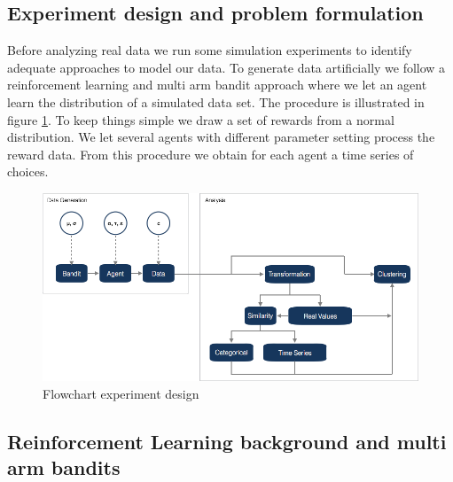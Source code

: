 \documentclass[12pt,a4paper,bibliography=totocnumbered,listof=totocnumbered]{scrartcl}
\begin{document}
\subsection{Experiment design and problem formulation}

Before analyzing real data we run some simulation experiments to identify adequate approaches to model our data. To generate data artificially we follow a reinforcement learning and multi arm bandit approach where we let an agent learn the distribution of a simulated data set. The procedure is illustrated in figure \ref{fig:flow}. To keep things simple we draw a set of rewards from a normal distribution. We let several agents with different parameter setting process the reward data. From this procedure we obtain for each agent a time series of choices. 

 \begin{figure}[!htb]
	\includegraphics[width=\textwidth]{Pictures/flow01.png}
	\caption{Flowchart experiment design}
	\label{fig:flow}
\end{figure}

\subsection{Reinforcement Learning background and multi arm bandits}
\end{document}
